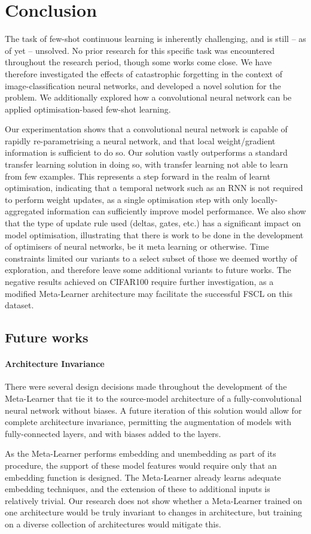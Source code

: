 \documentclass{report}
\begin{document}
\chapter{Conclusion}
The task of few-shot continuous learning is inherently challenging, and is still -- as of yet -- unsolved. No prior research for this specific task was encountered throughout the research period, though some works come close. We have therefore investigated the effects of catastrophic forgetting in the context of image-classification neural networks, and developed a novel solution for the problem. We additionally explored how a convolutional neural network can be applied optimisation-based few-shot learning. \par
Our experimentation shows that a convolutional neural network is capable of rapidly re-parametrising a neural network, and that local weight/gradient information is sufficient to do so. Our solution vastly outperforms a standard transfer learning solution in doing so, with transfer learning not able to learn from few examples. This represents a step forward in the realm of learnt optimisation, indicating that a temporal network such as an RNN is not required to perform weight updates, as a single optimisation step with only locally-aggregated information can sufficiently improve model performance. We also show that the type of update rule used (deltas, gates, etc.) has a significant impact on model optimisation, illustrating that there is work to be done in the development of optimisers of neural networks, be it meta learning or otherwise. Time constraints limited our variants to a select subset of those we deemed worthy of exploration, and therefore leave some additional variants to future works. The negative results achieved on CIFAR100 require further investigation, as a modified Meta-Learner architecture may facilitate the successful FSCL on this dataset.

\section{Future works} \label{future-works}
\subsubsection{Architecture Invariance}
There were several design decisions made throughout the development of the Meta-Learner that tie it to the source-model architecture of a fully-convolutional neural network without biases. A future iteration of this solution would allow for complete architecture invariance, permitting the augmentation of models with fully-connected layers, and with biases added to the layers. \par
As the Meta-Learner performs embedding and unembedding as part of its procedure, the support of these model features would require only that an embedding function is designed. The Meta-Learner already learns adequate embedding techniques, and the extension of these to additional inputs is relatively trivial. Our research does not show whether a Meta-Learner trained on one architecture would be truly invariant to changes in architecture, but training on a diverse collection of architectures would mitigate this.
\end{document}
